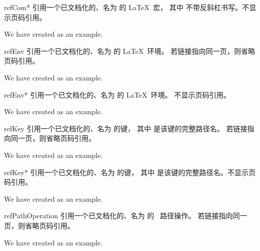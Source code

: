 \begin{docCommand}{refCom*}{}
  引用一个已文档化的、名为  的 \LaTeX\ 宏，
  其中  不带反斜杠书写。不显示页码引用。
\begin{dispExample}
We have created  as an example.
\end{dispExample}
\end{docCommand}


\begin{docCommand}{refEnv}{}
  引用一个已文档化的、名为  的 \LaTeX\ 环境。
  若链接指向同一页，则省略页码引用。
\begin{dispExample}
We have created  as an example.
\end{dispExample}
\end{docCommand}

\begin{docCommand}{refEnv*}{}
  引用一个已文档化的、名为  的 \LaTeX\ 环境。
  不显示页码引用。
\begin{dispExample}
We have created  as an example.
\end{dispExample}
\end{docCommand}


\begin{docCommand}{refKey}{}
  引用一个已文档化的、名为  的键，
  其中  是该键的完整路径名。
  若链接指向同一页，则省略页码引用。
\begin{dispExample}
We have created  as an example.
\end{dispExample}
\end{docCommand}

\begin{docCommand}{refKey*}{}
  引用一个已文档化的、名为  的键，
  其中  是该键的完整路径名。不显示页码引用。
\begin{dispExample}
We have created  as an example.
\end{dispExample}
\end{docCommand}

\clearpage

\begin{docCommand}[doc new=2019-09-17]{refPathOperation}{}
  引用一个已文档化的、名为  的 \tikzname\ 路径操作。
  若链接指向同一页，则省略页码引用。
\begin{dispExample}
We have created  as an example.
\end{dispExample}
\end{docCommand}

